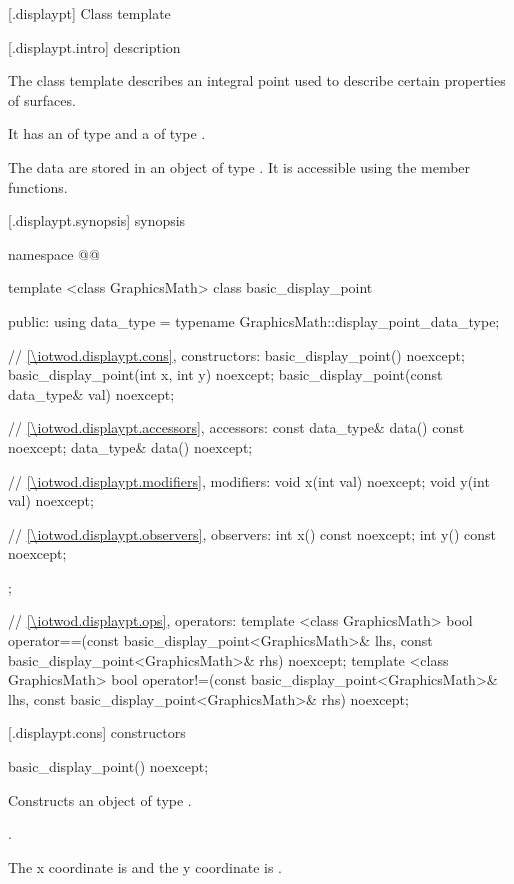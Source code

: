  [\iotwod.displaypt] {Class template }

 [\iotwod.displaypt.intro] { description}

%
\pnum
The class template  describes an integral point used to describe certain properties of surfaces.

\pnum
It has an  of type  and a  of type .

\pnum
The data are stored in an object of type . It is accessible using the  member functions.

 [\iotwod.displaypt.synopsis] { synopsis}

\begin{codeblock}
namespace @\fullnamespace{}@ {
  template <class GraphicsMath>
  class basic_display_point {
  public:
    using data_type = typename GraphicsMath::display_point_data_type;
    
    // \ref{\iotwod.displaypt.cons}, constructors:
    basic_display_point() noexcept;
    basic_display_point(int x, int y) noexcept;
    basic_display_point(const data_type& val) noexcept;

    // \ref{\iotwod.displaypt.accessors}, accessors:
    const data_type& data() const noexcept;
    data_type& data() noexcept;

    // \ref{\iotwod.displaypt.modifiers}, modifiers:
    void x(int val) noexcept;
    void y(int val) noexcept;

    // \ref{\iotwod.displaypt.observers}, observers:
    int x() const noexcept;
    int y() const noexcept;
  };

  // \ref{\iotwod.displaypt.ops}, operators:
  template <class GraphicsMath>
  bool operator==(const basic_display_point<GraphicsMath>& lhs,
    const basic_display_point<GraphicsMath>& rhs) noexcept;
  template <class GraphicsMath>
  bool operator!=(const basic_display_point<GraphicsMath>& lhs,
    const basic_display_point<GraphicsMath>& rhs) noexcept;
}
\end{codeblock}

 [\iotwod.displaypt.cons] { constructors}

%
\begin{itemdecl}
basic_display_point() noexcept;
\end{itemdecl}
\begin{itemdescr}
\pnum
\effects
Constructs an object of type .

\pnum
\postconditions
{}.

\pnum
\remarks
The x coordinate is  and the y coordinate is .
\end{itemdescr}

